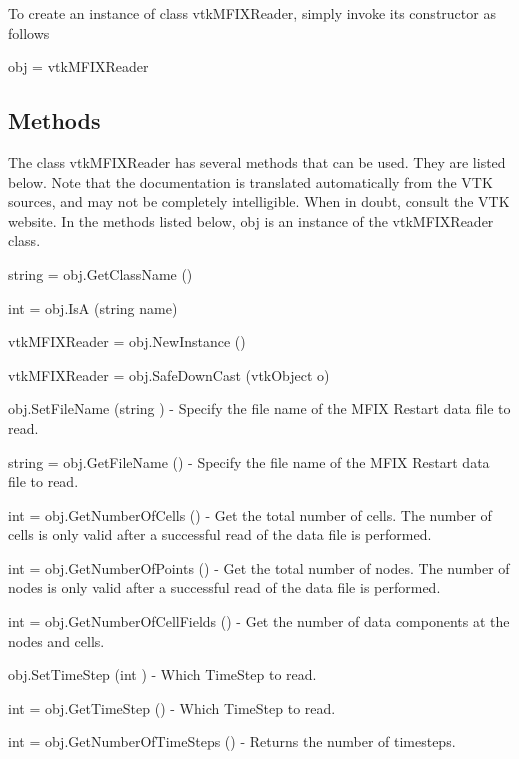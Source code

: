 To create an instance of class vtk\-M\-F\-I\-X\-Reader, simply invoke its constructor as follows \begin{DoxyVerb}  obj = vtkMFIXReader
\end{DoxyVerb}
 \hypertarget{vtkwidgets_vtkxyplotwidget_Methods}{}\subsection{Methods}\label{vtkwidgets_vtkxyplotwidget_Methods}
The class vtk\-M\-F\-I\-X\-Reader has several methods that can be used. They are listed below. Note that the documentation is translated automatically from the V\-T\-K sources, and may not be completely intelligible. When in doubt, consult the V\-T\-K website. In the methods listed below, {\ttfamily obj} is an instance of the vtk\-M\-F\-I\-X\-Reader class. 
\begin{DoxyItemize}
\item {\ttfamily string = obj.\-Get\-Class\-Name ()}  
\item {\ttfamily int = obj.\-Is\-A (string name)}  
\item {\ttfamily vtk\-M\-F\-I\-X\-Reader = obj.\-New\-Instance ()}  
\item {\ttfamily vtk\-M\-F\-I\-X\-Reader = obj.\-Safe\-Down\-Cast (vtk\-Object o)}  
\item {\ttfamily obj.\-Set\-File\-Name (string )} -\/ Specify the file name of the M\-F\-I\-X Restart data file to read.  
\item {\ttfamily string = obj.\-Get\-File\-Name ()} -\/ Specify the file name of the M\-F\-I\-X Restart data file to read.  
\item {\ttfamily int = obj.\-Get\-Number\-Of\-Cells ()} -\/ Get the total number of cells. The number of cells is only valid after a successful read of the data file is performed.  
\item {\ttfamily int = obj.\-Get\-Number\-Of\-Points ()} -\/ Get the total number of nodes. The number of nodes is only valid after a successful read of the data file is performed.  
\item {\ttfamily int = obj.\-Get\-Number\-Of\-Cell\-Fields ()} -\/ Get the number of data components at the nodes and cells.  
\item {\ttfamily obj.\-Set\-Time\-Step (int )} -\/ Which Time\-Step to read.  
\item {\ttfamily int = obj.\-Get\-Time\-Step ()} -\/ Which Time\-Step to read.  
\item {\ttfamily int = obj.\-Get\-Number\-Of\-Time\-Steps ()} -\/ Returns the number of timesteps.  

\end{DoxyItemize}
